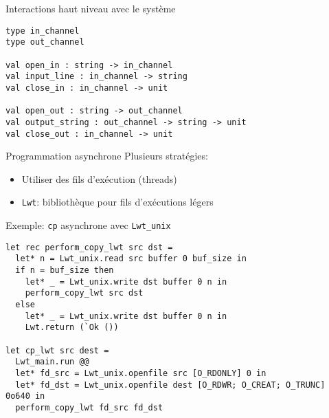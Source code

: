 
\begin{frame}[fragile]{Interactions haut niveau avec le système}
 

\begin{lstlisting}
type in_channel
type out_channel

val open_in : string -> in_channel
val input_line : in_channel -> string
val close_in : in_channel -> unit

val open_out : string -> out_channel
val output_string : out_channel -> string -> unit
val close_out : in_channel -> unit

\end{lstlisting}
    
\end{frame}

\begin{frame}{Programmation asynchrone}
Plusieurs stratégies:
\begin{itemize}
    \item Utiliser des fils d'exécution (threads)
    \item \texttt{Lwt}: bibliothèque pour fils d'exécutions légers
\end{itemize}
\end{frame}

\begin{frame}[fragile]{Exemple: \texttt{cp} asynchrone avec \texttt{Lwt\_unix}}

\begin{lstlisting}
let rec perform_copy_lwt src dst =
  let* n = Lwt_unix.read src buffer 0 buf_size in
  if n = buf_size then
    let* _ = Lwt_unix.write dst buffer 0 n in
    perform_copy_lwt src dst
  else
    let* _ = Lwt_unix.write dst buffer 0 n in
    Lwt.return (`Ok ())

let cp_lwt src dest =
  Lwt_main.run @@
  let* fd_src = Lwt_unix.openfile src [O_RDONLY] 0 in 
  let* fd_dst = Lwt_unix.openfile dest [O_RDWR; O_CREAT; O_TRUNC] 0o640 in
  perform_copy_lwt fd_src fd_dst
\end{lstlisting}
    
\end{frame}